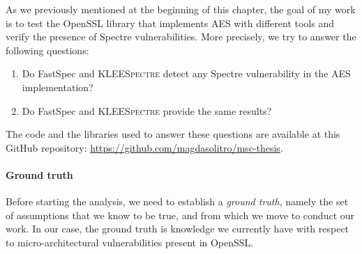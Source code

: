 \documentclass[12pt,a4paper]{book}
\theoremstyle{definition}
\begin{document}
	As we previously mentioned at the beginning of this chapter, the goal of my work is to test the OpenSSL library that implements AES with different tools and verify the presence of Spectre vulnerabilities. More precisely, we try to answer the following questions:
	\begin{enumerate}
		\item Do FastSpec and \textsc{KLEESpectre} detect any Spectre vulnerability in the AES implementation?
		\item Do FastSpec and \textsc{KLEESpectre} provide the same results?
		\begin{comment}
			\item Comparing the results obtained on AES in its OpenSSL v1.0.0\footnote{\url{https://github.com/openssl/openssl/tree/91bad2b09eb2ad77da8aca29f80f2d0677e75423}} implementation (last revised in 2015, before the discovering of Spectre) in its OpenSSL v3.0.0\footnote{\url{https://github.com/openssl/openssl/tree/89cd17a031e022211684eb7eb41190cf1910f9fa}} implementation (the latest version), are there any differences? 
		\end{comment}
	\end{enumerate}
	The code and the libraries used to answer these questions are available at this GitHub repository: \url{https://github.com/magdasolitro/msc-thesis}.
	
	\paragraph{Ground truth} Before starting the analysis, we need to establish a \textit{ground truth}, namely the set of assumptions that we know to be true, and from which we move to conduct our work. In our case, the ground truth is knowledge we currently have with respect to micro-architectural vulnerabilities present in OpenSSL. 
	
\end{document}
